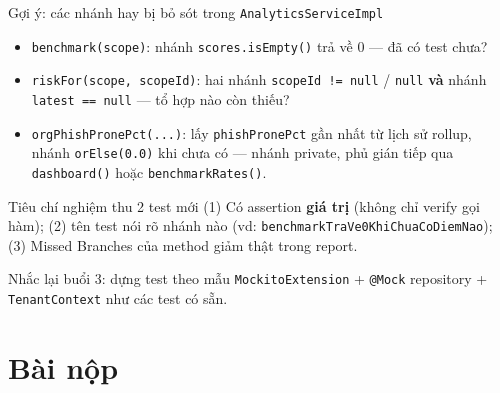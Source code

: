 \documentclass[aspectratio=169,12pt]{beamer}
\begin{document}
\begin{frame}{Gợi ý: các nhánh hay bị bỏ sót trong \texttt{AnalyticsServiceImpl}}
  \begin{itemize}
    \item \texttt{benchmark(scope)}: nhánh \texttt{scores.isEmpty()}
          trả về 0 --- đã có test chưa?
    \item \texttt{riskFor(scope, scopeId)}: hai nhánh
          \texttt{scopeId != null} / \texttt{null} \textbf{và}
          nhánh \texttt{latest == null} --- tổ hợp nào còn thiếu?
    \item \texttt{orgPhishPronePct(...)}: lấy \texttt{phishPronePct}
          gần nhất từ lịch sử rollup, nhánh \texttt{orElse(0.0)} khi chưa có
          --- nhánh private, phủ gián tiếp qua
          \texttt{dashboard()} hoặc \texttt{benchmarkRates()}.
  \end{itemize}

  \vspace{0.2em}
  \begin{alertblock}{Tiêu chí nghiệm thu 2 test mới}
    \small (1) Có assertion \textbf{giá trị} (không chỉ verify gọi hàm);
    (2) tên test nói rõ nhánh nào (vd:
    \texttt{benchmarkTraVe0KhiChuaCoDiemNao});
    (3) Missed Branches của method giảm thật trong report.
  \end{alertblock}

  \vspace{0.1em}
  {\small Nhắc lại buổi 3: dựng test theo mẫu \texttt{MockitoExtension} +
  \texttt{@Mock} repository + \texttt{TenantContext} như các test có sẵn.}
\end{frame}

\section{Bài nộp}
\end{document}
